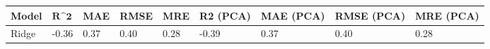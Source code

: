 \begin{table}
\centering
\label{table:iri_reg_pred}
\begin{tabular}{lllllllll}
\toprule
\textbf{Model} & $\textbf{R^2}$ & \textbf{MAE} & \textbf{RMSE} & \textbf{MRE} & \textbf{R2 (PCA)} & \textbf{MAE (PCA)} & \textbf{RMSE (PCA)} & \textbf{MRE (PCA)} \\
\midrule
         Ridge &          -0.36 &         0.37 &          0.40 &         0.28 &             -0.39 &               0.37 &                0.40 &               0.28 \\
\bottomrule
\end{tabular}
\end{table}
